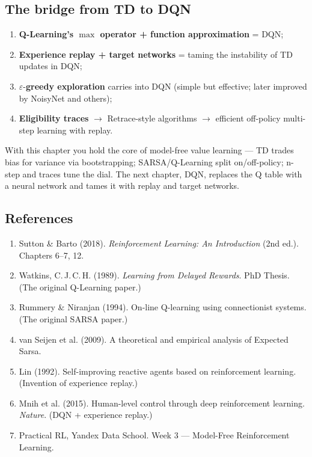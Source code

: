 \documentclass{article}
\begin{document}
\subsection*{The bridge from TD to DQN}

\begin{enumerate}
  \item \textbf{Q-Learning's $\max$ operator + function approximation} = DQN;
  \item \textbf{Experience replay + target networks} = taming the instability of TD updates in DQN;
  \item $\varepsilon$-\textbf{greedy exploration} carries into DQN (simple but effective; later improved by NoisyNet and others);
  \item \textbf{Eligibility traces} $\to$ Retrace-style algorithms $\to$ efficient off-policy multi-step learning with replay.
\end{enumerate}

With this chapter you hold the core of model-free value learning --- TD trades bias for variance via bootstrapping; SARSA/Q-Learning split on/off-policy; n-step and traces tune the dial. The next chapter, DQN, replaces the Q table with a neural network and tames it with replay and target networks.

\subsection*{References}

\begin{enumerate}
  \item Sutton \& Barto (2018). \textit{Reinforcement Learning: An Introduction} (2nd ed.). Chapters 6--7, 12.
  \item Watkins, C.\,J.\,C.\,H. (1989). \textit{Learning from Delayed Rewards}. PhD Thesis. (The original Q-Learning paper.)
  \item Rummery \& Niranjan (1994). On-line Q-learning using connectionist systems. (The original SARSA paper.)
  \item van Seijen et al. (2009). A theoretical and empirical analysis of Expected Sarsa.
  \item Lin (1992). Self-improving reactive agents based on reinforcement learning. (Invention of experience replay.)
  \item Mnih et al. (2015). Human-level control through deep reinforcement learning. \textit{Nature}. (DQN + experience replay.)
  \item Practical RL, Yandex Data School. Week 3 --- Model-Free Reinforcement Learning.
\end{enumerate}
\end{document}

